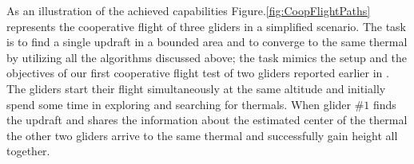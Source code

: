 \documentclass{ifacconf}
\begin{document}
%
%

As an illustration of the achieved capabilities Figure.\ref{fig:CoopFlightPaths} represents the cooperative flight of three gliders in a simplified scenario. The task is to find a single updraft in a bounded area and to converge to the same thermal by utilizing all the algorithms discussed above; the task mimics the setup and the objectives of our first cooperative flight test of two gliders reported earlier in \cite{AKlass_JGCD:2012}. The gliders start their flight simultaneously at the same altitude and initially spend some time in exploring and searching for thermals. When glider $\#1$ finds the updraft and shares the information about the estimated center of the thermal the other two gliders arrive to the same thermal and successfully gain height all together.
\end{document}
